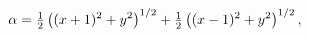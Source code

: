 \[\alpha=\tfrac{1}{2}\left((x+1)^{2}+y^{2}\right)^{1/2}+\tfrac{1}{2}\left((x-1)^%
{2}+y^{2}\right)^{1/2},\]